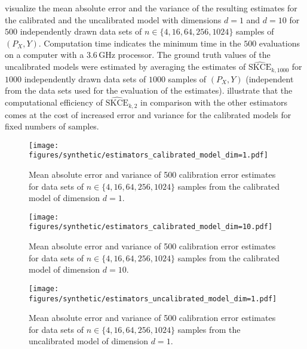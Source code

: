 \documentclass{article}
\begin{document}
 visualize the mean absolute error and the variance
of the resulting estimates for the calibrated and the uncalibrated model with dimensions
$d = 1$ and $d = 10$ for $500$ independently drawn data sets of $n \in \{4, 16, 64, 256, 1024\}$
samples of $(P_X, Y)$. Computation time indicates the minimum time in the $500$ evaluations
on a computer with a 3.6\,GHz processor. The ground truth values of the uncalibrated models were
estimated by averaging the estimates of $\widehat{\mathrm{SKCE}}_{k,1000}$
for $1000$ independently drawn data sets of $1000$ samples of $(P_X, Y)$ (independent from
the data sets used for the evaluation of the estimates).  illustrate that
the computational efficiency of $\widehat{\mathrm{SKCE}}_{k,2}$ in comparison with the
other estimators comes at the cost of increased error and variance for the calibrated models
for fixed numbers of samples.

\begin{figure}[hpt]
    \begin{center}
        \texttt{[image: figures/synthetic/estimators\_calibrated\_model\_dim=1.pdf]}
        \caption{Mean absolute error and variance of 500 calibration error estimates for
        data sets of $n \in \{4, 16, 64, 256, 1024\}$ samples from the calibrated model
        of dimension $d = 1$.}
        \label{fig:synthetic_estimators_calibrated_1}
    \end{center}
\end{figure}

\begin{figure}[hpt]
    \begin{center}
        \texttt{[image: figures/synthetic/estimators\_calibrated\_model\_dim=10.pdf]}
        \caption{Mean absolute error and variance of 500 calibration error estimates for
        data sets of $n \in \{4, 16, 64, 256, 1024\}$ samples from the calibrated model
        of dimension $d = 10$.}
        \label{fig:synthetic_estimators_calibrated_10}
    \end{center}
\end{figure}

\begin{figure}[hpt]
    \begin{center}
        \texttt{[image: figures/synthetic/estimators\_uncalibrated\_model\_dim=1.pdf]}
        \caption{Mean absolute error and variance of 500 calibration error estimates for
        data sets of $n \in \{4, 16, 64, 256, 1024\}$ samples from the uncalibrated model
        of dimension $d = 1$.}
        \label{fig:synthetic_estimators_uncalibrated_1}
    \end{center}
\end{figure}
\end{document}

